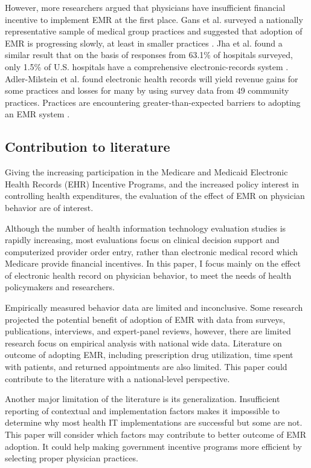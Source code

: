 However, more researchers argued that physicians have insufficient financial incentive to implement EMR at the first place. Gans et al. surveyed a nationally representative sample of medical group practices and suggested that adoption of EMR is progressing slowly, at least in smaller practices \citep{Gans2005}. Jha et al. found a similar result that on the basis of responses from 63.1\% of hospitals surveyed, only 1.5\% of U.S. hospitals have a comprehensive electronic-records system \citep{Jha2009}. Adler-Milstein et al. found electronic health records will yield revenue gains for some practices and losses for many by using survey data from 49 community practices. Practices are encountering greater-than-expected barriers to adopting an EMR system \citep{Adler-Milstein2012}.

\subsection{Contribution to literature}

Giving the increasing participation in the Medicare and Medicaid Electronic Health Records (EHR) Incentive Programs, and the increased policy interest in controlling health expenditures, the evaluation of the effect of EMR on physician behavior are of interest.

Although the number of health information technology evaluation studies is rapidly increasing, most evaluations focus on clinical decision support and computerized provider order entry, rather than electronic medical record which Medicare provide financial incentives. In this paper, I focus mainly on the effect of electronic health record on physician behavior, to meet the needs of health policymakers and researchers.

Empirically measured behavior data are limited and inconclusive. Some research projected the potential benefit of adoption of EMR with data from surveys, publications, interviews, and expert-panel reviews, however, there are limited research focus on empirical analysis with national wide data. Literature on outcome of adopting EMR, including prescription drug utilization, time spent with patients, and returned appointments are also limited. This paper could contribute to the literature with a national-level perspective.

Another major limitation of the literature is its generalization. Insufficient reporting of contextual and implementation factors makes it impossible to determine why most health IT implementations are successful but some are not. This paper will consider which factors may contribute to better outcome of EMR adoption. It could help making government incentive programs more efficient by selecting proper physician practices.

